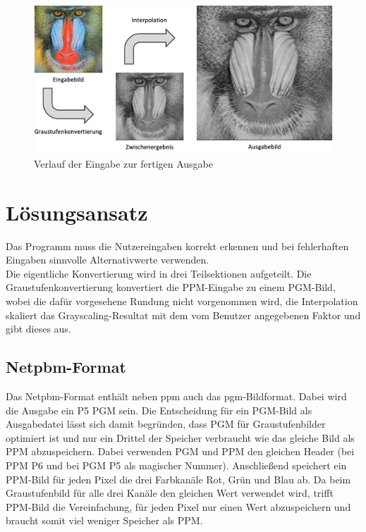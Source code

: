 \documentclass[course=erap]{aspdoc}
\begin{document}
\begin{figure}[ht]
    \centering
    \includegraphics[scale=0.8]{assets/verlauf.png}
    \caption{Verlauf der Eingabe zur fertigen Ausgabe}
    \label{fig:verlauf}
\end{figure}

\section{Lösungsansatz}
Das Programm muss die Nutzereingaben korrekt erkennen und bei fehlerhaften Eingaben sinnvolle Alternativwerte verwenden.\\
Die eigentliche Konvertierung wird in drei Teilsektionen aufgeteilt. Die Graustufenkonvertierung konvertiert die PPM-Eingabe zu einem PGM-Bild, wobei die dafür vorgesehene Rundung nicht vorgenommen wird, die Interpolation skaliert das Grayscaling-Resultat mit dem vom Benutzer angegebenen Faktor und gibt dieses aus.

\subsection{Netpbm-Format}
Das Netpbm-Format enthält neben ppm auch das pgm-Bildformat. Dabei wird die Ausgabe ein P5 PGM sein. Die Entscheidung für ein PGM-Bild als Ausgabedatei lässt sich damit begründen, dass PGM für Graustufenbilder optimiert ist und nur ein Drittel der Speicher verbraucht wie das gleiche Bild als PPM abzuspeichern. Dabei verwenden PGM und PPM den gleichen Header (bei PPM P6 und bei PGM P5 als magischer Nummer). Anschließend speichert ein PPM-Bild für jeden Pixel die drei Farbkanäle Rot, Grün und Blau ab. Da beim Graustufenbild für alle drei Kanäle den gleichen Wert verwendet wird, trifft PPM-Bild die Vereinfachung, für jeden Pixel nur einen Wert abzuspeichern und braucht somit viel weniger Speicher als PPM.
\end{document}
